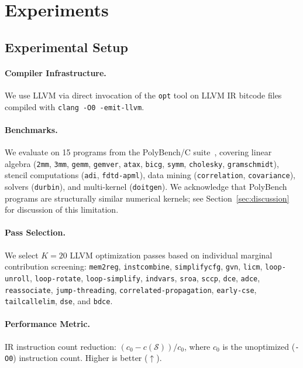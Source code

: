 \documentclass[preprint]{article}
\newcommand{\passset}{\mathcal{S}}
\begin{document}
\section{Experiments}
\label{sec:experiments}

\subsection{Experimental Setup}

\paragraph{Compiler Infrastructure.} We use LLVM via direct invocation of the \texttt{opt} tool on LLVM IR bitcode files compiled with \texttt{clang -O0 -emit-llvm}.

\paragraph{Benchmarks.} We evaluate on 15 programs from the PolyBench/C suite~\citep{polybench}, covering linear algebra (\texttt{2mm}, \texttt{3mm}, \texttt{gemm}, \texttt{gemver}, \texttt{atax}, \texttt{bicg}, \texttt{symm}, \texttt{cholesky}, \texttt{gramschmidt}), stencil computations (\texttt{adi}, \texttt{fdtd-apml}), data mining (\texttt{correlation}, \texttt{covariance}), solvers (\texttt{durbin}), and multi-kernel (\texttt{doitgen}). We acknowledge that PolyBench programs are structurally similar numerical kernels; see Section~\ref{sec:discussion} for discussion of this limitation.

\paragraph{Pass Selection.} We select $K{=}20$ LLVM optimization passes based on individual marginal contribution screening: \texttt{mem2reg}, \texttt{instcombine}, \texttt{simplifycfg}, \texttt{gvn}, \texttt{licm}, \texttt{loop-unroll}, \texttt{loop-rotate}, \texttt{loop-simplify}, \texttt{indvars}, \texttt{sroa}, \texttt{sccp}, \texttt{dce}, \texttt{adce}, \texttt{reassociate}, \texttt{jump-threading}, \texttt{correlated-propagation}, \texttt{early-cse}, \texttt{tailcallelim}, \texttt{dse}, and \texttt{bdce}.

\paragraph{Performance Metric.} IR instruction count reduction: $(c_0 - c(\passset)) / c_0$, where $c_0$ is the unoptimized (\texttt{-O0}) instruction count. Higher is better ($\uparrow$).
\end{document}
